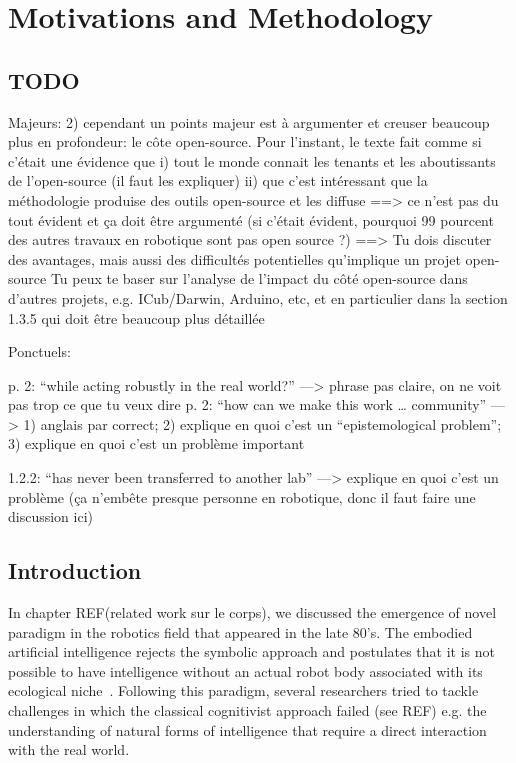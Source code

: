 
\chapter{Motivations and Methodology}


\section{TODO}

Majeurs:
2) cependant un points majeur est à argumenter et creuser beaucoup plus en profondeur: le côte open-source. Pour l’instant, le texte fait comme si c’était une évidence que
   i) tout le monde connait les tenants et les aboutissants de l’open-source (il faut les expliquer)
  ii) que c’est intéressant que la méthodologie produise des outils open-source et les diffuse
  ==> ce n’est pas du tout évident et ça doit être argumenté (si c’était évident, pourquoi 99 pourcent des autres travaux en robotique sont pas open source ?)
  ==> Tu dois discuter des avantages, mais aussi des difficultés potentielles qu’implique un projet open-source
 Tu peux te baser sur l’analyse de l’impact du côté open-source dans d’autres projets, e.g. ICub/Darwin, Arduino, etc, et en particulier dans la section 1.3.5 qui doit être beaucoup plus détaillée

Ponctuels:


p. 2: “while acting robustly in the real world?” —> phrase pas claire, on ne voit pas trop ce que tu veux dire
p. 2: “how can we make this work … community” —> 1) anglais par correct; 2) explique en quoi c’est un “epistemological problem”; 3) explique en quoi c’est un problème important

1.2.2: “has never been transferred to another lab” —> explique en quoi c’est un problème (ça n’embête presque personne en robotique, donc il faut faire une discussion ici)




\section{Introduction} %

In chapter REF(related work sur le corps), we discussed the emergence of novel paradigm in the robotics field that appeared in the late 80's. The embodied artificial intelligence rejects the symbolic approach and postulates that it is not possible to have intelligence without an actual robot body associated with its ecological niche~\cite{pfeifer2001understanding}. Following this paradigm, several researchers tried to tackle challenges in which the classical cognitivist approach failed (see REF) e.g. the understanding of natural forms of intelligence that require a direct interaction with the real world.

